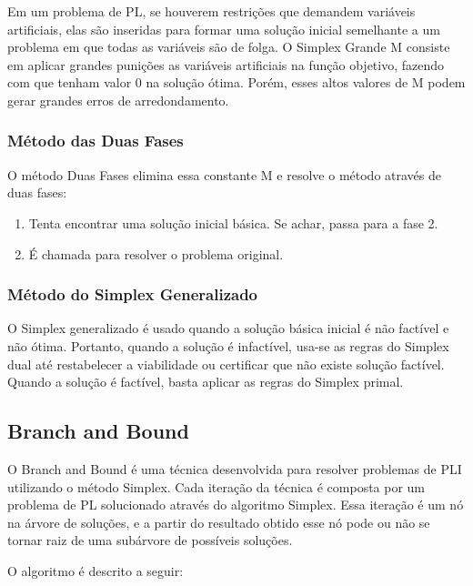 \documentclass [11pt]{articleSBPO}
\begin{document}
Em um problema de PL, se houverem restrições que demandem variáveis artificiais, elas são inseridas para formar uma solução inicial semelhante a um problema em que todas as variáveis são de folga. O Simplex Grande M consiste em aplicar grandes punições as variáveis artificiais na função objetivo, fazendo com que tenham valor 0 na solução ótima.
Porém, esses altos valores de M podem gerar grandes erros de arredondamento. 

\subsubsection{Método das Duas Fases}\label{subsubsec:duasfases}

O método Duas Fases elimina essa constante M e resolve o método através de duas fases:

\begin{enumerate}
	\item Tenta encontrar uma solução inicial básica. Se achar, passa para a fase 2.
	\item É chamada para resolver o problema original.
\end{enumerate}

\subsubsection{Método do Simplex Generalizado}\label{subsubsec:generalizado}

O Simplex generalizado é usado quando a solução básica inicial é não factível e não ótima. Portanto, quando a solução é infactível, usa-se as regras do Simplex dual até restabelecer a viabilidade ou certificar que não existe solução factível. Quando a solução é factível, basta aplicar as regras do Simplex primal.

\subsection{Branch and Bound}\label{subsec:bnb}

O Branch and Bound é uma técnica desenvolvida para resolver problemas de PLI utilizando o método Simplex. Cada iteração da técnica é composta por um problema de PL solucionado através do algoritmo Simplex. Essa iteração é um nó na árvore de soluções, e a partir do resultado obtido esse nó pode ou não se tornar raiz de uma subárvore de possíveis soluções.

O algoritmo é descrito a seguir:

\bigskip
\end{document}
